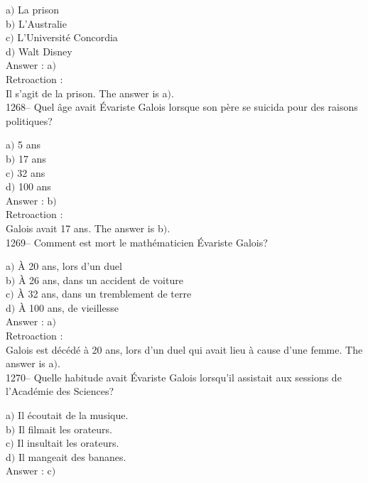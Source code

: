 ﻿\documentclass[letterpaper, 12pt]{article}
\begin{document}
a$)$ La prison \\
b$)$ L'Australie \\
c$)$ L'Universit\'e Concordia \\
d$)$ Walt Disney\\

Answer : a$)$\\

Retroaction : \\
Il s'agit de la prison.
The answer is a$)$.\\

1268-- Quel \^age avait \'Evariste Galois lorsque son p\`ere se
suicida pour des raisons politiques?

a$)$ 5 ans \\
b$)$ 17 ans \\
c$)$ 32 ans \\
d$)$ 100 ans\\

Answer : b$)$\\

Retroaction : \\
Galois avait 17 ans.
The answer is b$)$.\\

1269-- Comment est mort le math\'ematicien \'Evariste Galois?

a$)$ \`A 20 ans, lors d'un duel \\
b$)$ \`A 26 ans, dans un accident de voiture \\
c$)$ \`A 32 ans, dans un tremblement de terre \\
d$)$ \`A 100 ans, de vieillesse\\

Answer : a$)$\\

Retroaction : \\
Galois est d\'ec\'ed\'e \`a 20 ans, lors d'un duel
qui avait lieu \`a cause d'une femme.
The answer is a$)$.\\

1270-- Quelle habitude avait \'Evariste Galois lorsqu'il assistait
aux sessions de l'Acad\'emie des Sciences?

a$)$ Il \'ecoutait de la musique. \\
b$)$ Il filmait les orateurs. \\
c$)$ Il insultait les orateurs. \\
d$)$ Il mangeait des bananes.\\

Answer : c$)$\\
\end{document}
